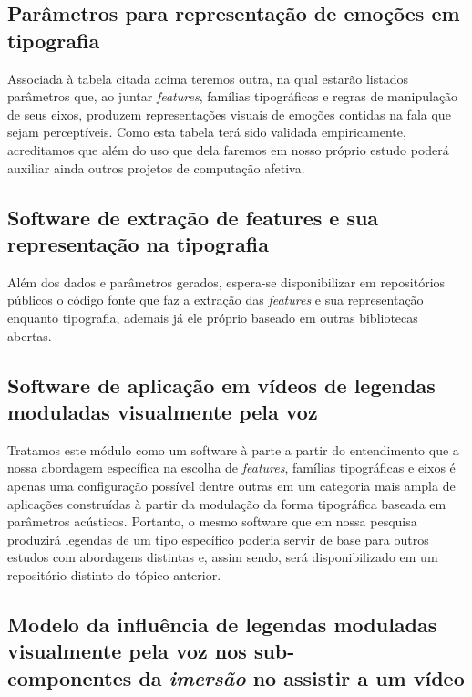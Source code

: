 \documentclass[a4paper,11pt,titlepage,singlespacing]{article}
\begin{document}
    \subsection{Parâmetros para representação de emoções em tipografia}
    
    Associada à tabela citada acima teremos outra, na qual estarão listados parâmetros que, ao juntar \textit{features}, famílias tipográficas e regras de manipulação de seus eixos, produzem representações visuais de emoções contidas na fala que sejam perceptíveis. Como esta tabela terá sido validada empiricamente, acreditamos que além do uso que dela faremos em nosso próprio estudo poderá auxiliar ainda outros projetos de computação afetiva.
    
    \subsection{Software de extração de features e sua representação na tipografia}
    
    Além dos dados e parâmetros gerados, espera-se disponibilizar em repositórios públicos o código fonte que faz a extração das \textit{features} e sua representação enquanto tipografia, ademais já ele próprio baseado em outras bibliotecas abertas.
    
    \subsection{Software de aplicação em vídeos de legendas moduladas visualmente pela voz}
    
    Tratamos este módulo como um software à parte a partir do entendimento que a nossa abordagem específica na escolha de \textit{features}, famílias tipográficas e eixos é apenas uma configuração possível dentre outras em um categoria mais ampla de aplicações construídas à partir da modulação da forma tipográfica baseada em parâmetros acústicos. Portanto, o mesmo software que em nossa pesquisa produzirá legendas de um tipo específico poderia servir de base para outros estudos com abordagens distintas e, assim sendo, será disponibilizado em um repositório distinto do tópico anterior.
    
    \subsection{Modelo da influência de legendas moduladas visualmente pela voz nos sub-\\componentes da \textit{imersão} no assistir a um vídeo}
    
\end{document}
